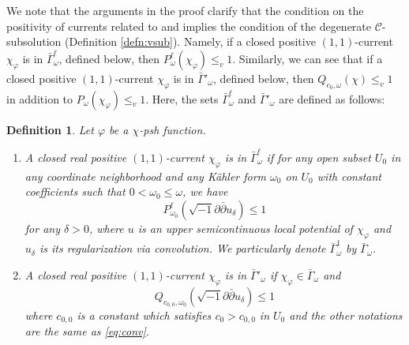 \documentclass[10pt,a4paper]{amsart}
\numberwithin{equation}{section}
\newtheorem{defn}[equation]{Definition}
\newcommand{\delb}{\sqrt{-1}\partial\bar{\partial}}
\begin{document}
We note that the arguments in the proof clarify that the condition on the positivity of currents related to \cite[Definition 3.3]{GChen} and \cite[Definition 1]{Datar-Pingali} implies the condition of the degenerate $\mathcal{C}$-subsolution (Definition \ref{defn:vsub}). Namely, if a closed positive $(1,1)$-current $\chi_\varphi$ is in $\bar{\Gamma}^\ell_\omega$, defined below, then $P^\ell_\omega(\chi_\varphi)\le_v 1$. Similarly, we can see that if a closed positive $(1,1)$-current $\chi_\varphi$ is in $\bar{\Gamma}'_\omega$, defined below, then $Q_{c_0,\omega}(\chi)\le_v 1$ in addition to $P_{\omega}(\chi_\varphi)\le_v1$.
Here, the sets $\bar{\Gamma}^\ell_\omega$ and $\bar{\Gamma}'_\omega$ are defined as follows:
\begin{defn}\label{def:gammabar}
    Let $\varphi$ be a $\chi$-psh function.
    \begin{enumerate}[label={\upshape(\roman*)}]
        \item\label{item:gammal} A closed real positive $(1,1)$-current $\chi_\varphi$ is in $\bar{\Gamma}^\ell_\omega$ if for any open subset $U_0$ in any coordinate neighborhood and any K{\"a}hler form $\omega_0$ on $U_0$ with constant coefficients such that $0<\omega_0 \le \omega$, we have
        \begin{equation}\label{eq:conv}
            P^\ell_{\omega_0}(\delb u_\delta) \le 1
        \end{equation} 
        for any $\delta>0$, where $u$ is an upper semicontinuous local potential of $\chi_\varphi$ and $u_\delta$ is its regularization via convolution. We particularly denote $\bar{\Gamma}^1_\omega$ by $\bar{\Gamma}_\omega$.
        \item\label{item:gamma'} A closed real positive $(1,1)$-current $\chi_\varphi$ is in $\bar{\Gamma}'_\omega$ if $\chi_\varphi\in\bar{\Gamma}_\omega$ and 
        $$Q_{c_{0,0},\omega_0}(\delb u_\delta) \le 1$$ 
        where $c_{0,0}$ is a constant which satisfies $c_0>c_{0,0}$ in $U_0$ and the other notations are the same as \eqref{eq:conv}.
    \end{enumerate}
\end{defn}
\end{document}
